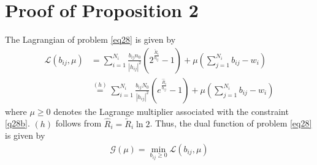 \documentclass[journal]{IEEEtran}
\begin{document}
\section{Proof of Proposition 2}
The Lagrangian of problem \eqref{eq28} is given by
\begin{align}
\mathcal{L}\left(b_{ij}, \mu\right) &=  \sum\limits_{i = 1}^{N_i} \frac{b_{ij}n_0}{\left|h_{ij}\right|^2}\left(2^{\frac{\tilde{R}_i}{b_{ij}}} - 1\right) + \mu\left(\sum_{j = 1}^{N_i}b_{ij} - w_i\right) \nonumber \\ 
& \overset{\left(h\right)}{=} \sum\limits_{i = 1}^{N_i} \frac{b_{ij}N_0}{\left|h_{ij}\right|^2}\left(e^{\frac{\hat{R}_i}{b_{ij}}} - 1\right) + \mu\left(\sum_{j = 1}^{N_i}b_{ij} - w_i\right) 
\end{align}
where $\mu \geq 0$ denotes the Lagrange multiplier associated with the constraint \eqref{q28b}. $\left(h\right)$ follows from $\hat{R}_i = \tilde{R}_i \ln2$. Thus, the dual function of problem \eqref{eq28} is given by
\begin{align}
\mathcal{G}\left(\mu\right) = \min_{b_{ij}\geq 0} \mathcal{L}\left(b_{ij},\mu\right)
\end{align}
\end{document}
